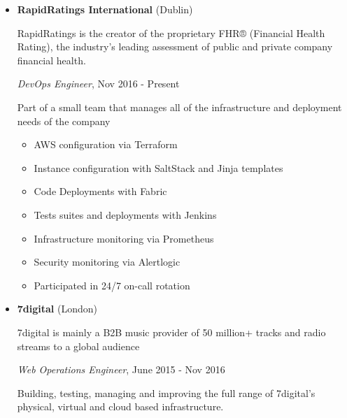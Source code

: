 \documentclass[]{article}
\providecommand{\tightlist}{%
  \setlength{\itemsep}{0pt}\setlength{\parskip}{0pt}}
\begin{document}
\begin{itemize}
\item
  \textbf{RapidRatings International} (Dublin)

  RapidRatings is the creator of the proprietary FHR® (Financial Health
  Rating), the industry's leading assessment of public and private
  company financial health.

  \emph{DevOps Engineer}, Nov 2016 - Present

  Part of a small team that manages all of the infrastructure and
  deployment needs of the company

  \begin{itemize}
  \tightlist
  \item
    AWS configuration via Terraform
  \item
    Instance configuration with SaltStack and Jinja templates
  \item
    Code Deployments with Fabric
  \item
    Tests suites and deployments with Jenkins
  \item
    Infrastructure monitoring via Prometheus
  \item
    Security monitoring via Alertlogic
  \item
    Participated in 24/7 on-call rotation
  \end{itemize}
\item
  \textbf{7digital} (London)

  7digital is mainly a B2B music provider of 50 million+ tracks and
  radio streams to a global audience

  \emph{Web Operations Engineer}, June 2015 - Nov 2016

  Building, testing, managing and improving the full range of 7digital's
  physical, virtual and cloud based infrastructure.


\end{itemize}
\end{document}
